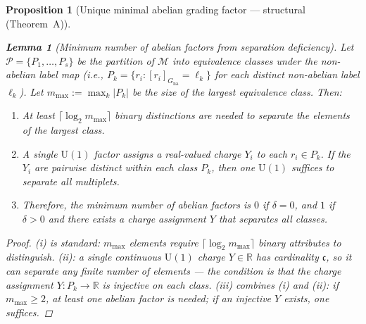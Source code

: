 \documentclass[11pt,a4paper]{article}
\newtheorem{lemma}[theorem]{Lemma}
\newtheorem{proposition}[theorem]{Proposition}
\theoremstyle{definition}
\newcommand{\U}{\mathrm{U}}
\begin{document}
\begin{proposition}[Unique minimal abelian grading factor ---
structural (Theorem~A)]
\begin{lemma}[Minimum number of abelian factors from separation deficiency]
\label{lem:min_abelian}
Let $\mathcal{P} = \{P_1, \ldots, P_s\}$ be the partition of
$\mathcal{M}$ into equivalence classes under the non-abelian label
map (i.e., $P_k = \{r_i : [r_i]_{G_{\mathrm{na}}} = \ell_k\}$
for each distinct non-abelian label $\ell_k$).  Let
$m_{\max} := \max_k |P_k|$ be the size of the largest equivalence
class.  Then:
\begin{enumerate}[label=(\roman*),nosep]
  \item At least $\lceil \log_2 m_{\max} \rceil$ binary distinctions
  are needed to separate the elements of the largest class.
  \item A single $\U(1)$ factor assigns a real-valued charge $Y_i$ to
  each $r_i \in P_k$.  If the $Y_i$ are pairwise distinct within
  each class $P_k$, then one $\U(1)$ suffices to separate all
  multiplets.
  \item Therefore, the minimum number of abelian factors is $0$ if
  $\delta = 0$, and $1$ if $\delta > 0$ and there exists a charge
  assignment $Y$ that separates all classes.
\end{enumerate}
\end{lemma}

\begin{proof}
(i) is standard: $m_{\max}$ elements require $\lceil \log_2 m_{\max}
\rceil$ binary attributes to distinguish.  (ii): a single continuous
$\U(1)$ charge $Y \in \mathbb{R}$ has cardinality $\mathfrak{c}$, so
it can separate any finite number of elements --- the condition is that
the charge assignment $Y: P_k \to \mathbb{R}$ is injective on each
class.  (iii) combines (i) and (ii): if $m_{\max} \ge 2$, at least
one abelian factor is needed; if an injective $Y$ exists, one
suffices.
\end{proof}


\end{proposition}
\end{document}
